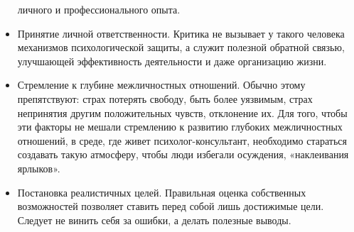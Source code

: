 \documentclass[a4paper, 12pt]{report}
\begin{document}
\begin{itemize}
    личного и профессионального опыта.
    \item Принятие личной ответственности. Критика не вызывает у такого
    человека механизмов психологической защиты, а служит полезной
    обратной связью, улучшающей эффективность деятельности и даже
    организацию жизни.
    \item Стремление к глубине межличностных отношений. Обычно этому
    препятствуют: страх потерять свободу, быть более уязвимым, страх
    непринятия другим положительных чувств, отклонение их. Для того,
    чтобы эти факторы не мешали стремлению к развитию глубоких
    межличностных отношений, в среде, где живет психолог-консультант,
    необходимо стараться создавать такую атмосферу, чтобы люди избегали
    осуждения, «наклеивания ярлыков».
    \item Постановка реалистичных целей. Правильная оценка собственных
    возможностей позволяет ставить перед собой лишь достижимые цели.
    Следует не винить себя за ошибки, а делать полезные выводы. 
\end{itemize}
    
\end{document}
